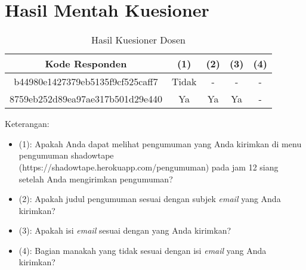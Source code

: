 \section{Hasil Mentah Kuesioner}
\begin{table}[H]
	\caption{Hasil Kuesioner Dosen}
	\label{table:hasil-kuesioner-dosen}
	\centering
	\begin{tabular}{|c|c|c|c|c|}
 			\hline
			\textbf{Kode Responden} & \textbf{(1)} & \textbf{(2)} & \textbf{(3)}  & \textbf{(4)} \\
			\hline
			b44980e1427379eb5135f9cf525caff7 & Tidak & - & - & - \\
			\hline
			8759eb252d89ea97ae317b501d29e440 & Ya & Ya & Ya & - \\
            \hline
	\end{tabular}
\end{table}
Keterangan:
\begin{itemize}
\item (1): Apakah Anda dapat melihat pengumuman yang Anda kirimkan di menu pengumuman shadowtape (https://shadowtape.herokuapp.com/pengumuman) pada jam 12 siang setelah Anda mengirimkan pengumuman?
\item (2): Apakah judul pengumuman sesuai dengan subjek \textit{email} yang Anda kirimkan?
\item (3): Apakah isi \textit{email} sesuai dengan yang Anda kirimkan?
\item (4): Bagian manakah yang tidak sesuai dengan isi \textit{email} yang Anda kirimkan?
\end{itemize}

